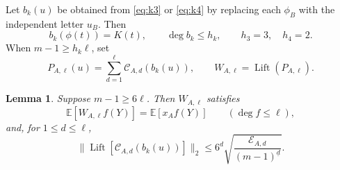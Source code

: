 \documentclass[11pt]{article}
\newtheorem{lemma}{Lemma}
\newcommand{\E}{\mathbb E}
\DeclareMathOperator{\Lift}{Lift}
\begin{document}
Let \(b_k(u)\) be obtained from \eqref{eq:k3} or \eqref{eq:k4} by replacing each \(\phi_B\) with the independent letter \(u_B\).
Then
\begin{equation}\label{eq:substitution}
b_k(\phi(t))=K(t),\qquad
\deg b_k\le h_k,\qquad h_3=3,\quad h_4=2.
\end{equation}
When \(m-1\ge h_k\ell\), set
\begin{equation}\label{eq:witness-definition}
P_{A,\ell}(u)=\sum_{d=1}^\ell\mathcal C_{A,d}(b_k(u)),
\qquad
W_{A,\ell}=\Lift(P_{A,\ell}).
\end{equation}

\begin{lemma}\label{lem:lift}
Suppose \(m-1\ge6\ell\).
Then \(W_{A,\ell}\) satisfies
\begin{equation}\label{eq:moment-matching}
\E[W_{A,\ell}f(Y)]=\E[x_Af(Y)]
\qquad(\deg f\le \ell),
\end{equation}
and, for \(1\le d\le \ell\),
\begin{equation}\label{eq:lift-bound}
\bigl\|\Lift[\mathcal C_{A,d}(b_k(u))]\bigr\|_2
\le6^d\sqrt{\frac{\mathcal E_{A,d}}{(m-1)^{\underline d}}}.
\end{equation}
\end{lemma}
\end{document}
